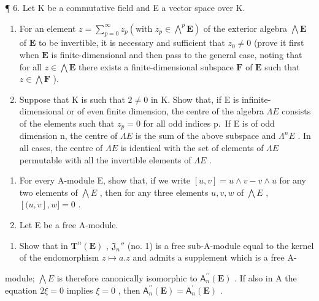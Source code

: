 ¶ 6. Let K be a commutative field and E a vector space over K.

\begin{enumerate}
\def\labelenumi{(\alph{enumi})}
\item
  For an element \(z = \sum_{p=0}^{\infty} z_p \left( \text{with } z_p \in \bigwedge^p \mathbf{E} \right)\) of the exterior algebra \(\bigwedge \mathbf{E}\) of \(\mathbf{E}\) to be invertible, it is necessary and sufficient that \(z_0 \neq 0\) (prove it first when \(\mathbf{E}\) is finite-dimensional and then pass to the general case, noting that for all \(z \in \bigwedge \mathbf{E}\) there exists a finite-dimensional subspace \(\mathbf{F}\) of \(\mathbf{E}\) such that \(z \in \bigwedge \mathbf{F}\) ).
\item
  Suppose that K is such that \(2 \neq 0\) in K. Show that, if E is infinite-dimensional or of even finite dimension, the centre of the algebra \(\Lambda E\) consists of the elements such that \(z_{p} = 0\) for all odd indices p.~If E is of odd dimension n, the centre of \(\Lambda E\) is the sum of the above subspace and \(\Lambda^{n}E\) . In all cases, the centre of \(\Lambda E\) is identical with the set of elements of \(\Lambda E\) permutable with all the invertible elements of \(\Lambda E\) .
\end{enumerate}

\begin{enumerate}
\def\labelenumi{\arabic{enumi}.}
\setcounter{enumi}{6}
\item
  For every A-module E, show that, if we write \([u, v] = u \wedge v - v \wedge u\) for any two elements of \(\bigwedge E\) , then for any three elements \(u, v, w\) of \(\bigwedge E\) , \([(u, v], w] = 0\) .
\item
  Let E be a free A-module.
\end{enumerate}

\begin{enumerate}
\def\labelenumi{(\alph{enumi})}
\tightlist
\item
  Show that in \(\mathbf{T}^n (\mathbf{E})\) , \(\mathfrak{J}_n''\) (no. 1) is a free sub-A-module equal to the kernel of the endomorphism \(z\mapsto a.z\) and admits a supplement which is a free A-
\end{enumerate}

module; \(\bigwedge E\) is therefore canonically isomorphic to \(\mathsf{A}_n^{\prime \prime}(\mathbf{E})\) . If also in A the equation \(2\xi = 0\) implies \(\xi = 0\) , then \(\mathsf{A}_n^{\prime \prime}(\mathbf{E}) = \mathsf{A}_n^{\prime}(\mathbf{E})\) .

